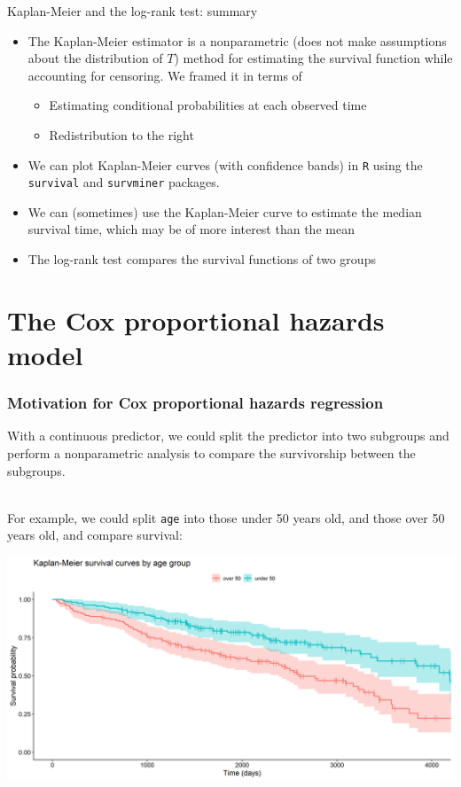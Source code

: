 \documentclass[10pt,t]{beamer}
\begin{document}
\begin{frame}{Kaplan-Meier and the log-rank test: summary}
	\begin{itemize}
		\item The Kaplan-Meier estimator is a nonparametric (does not make assumptions about the distribution of $T$) method for estimating the survival function while accounting for censoring. We framed it in terms of
		\begin{itemize}
			\item Estimating conditional probabilities at each observed time
			\item Redistribution to the right
		\end{itemize}
		\item We can plot Kaplan-Meier curves (with confidence bands) in \texttt{R} using the \texttt{survival} and \texttt{survminer} packages. 
		\item We can (sometimes) use the Kaplan-Meier curve to estimate the median survival time, which may be of more interest than the mean
		\item The log-rank test compares the survival functions of two groups
	\end{itemize}
\end{frame}

\section{The Cox proportional hazards model}
\begin{frame}
\frametitle{Motivation for Cox proportional hazards regression}
\vspace{-0.8cm}
With a continuous predictor, we could split the predictor into two subgroups and perform a nonparametric analysis to compare the survivorship between the subgroups.
\\ ~\ 

For example, we could split \texttt{age} into those under 50 years old, and those over 50 years old, and compare survival:

\begin{center}
\includegraphics[width = \textwidth]{figs/KM_strat_age.png}
\end{center}
\end{frame}
\end{document}
